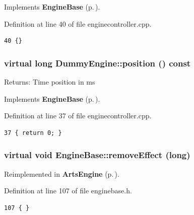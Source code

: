 Implements {\bf Engine\-Base} {\rm (p.\,\pageref{classEngineBase_EngineBasei0})}.

Definition at line 40 of file enginecontroller.cpp.



\footnotesize\begin{verbatim}40 {}
\end{verbatim}\normalsize 
{}
\subsubsection{\setlength{\rightskip}{0pt plus 5cm}virtual long Dummy\-Engine::position () const\hspace{0.3cm}{\tt  [inline, private, virtual]}}\label{classDummyEngine_DummyEngined4}


\begin{Desc}
\item[Returns:]Time position in ms \end{Desc}


Implements {\bf Engine\-Base} {\rm (p.\,\pageref{classEngineBase_EngineBasea7})}.

Definition at line 37 of file enginecontroller.cpp.



\footnotesize\begin{verbatim}37 { return 0; }
\end{verbatim}\normalsize 
{}
\subsubsection{\setlength{\rightskip}{0pt plus 5cm}virtual void Engine\-Base::remove\-Effect (long)\hspace{0.3cm}{\tt  [inline, virtual, inherited]}}\label{classEngineBase_EngineBasea21}




Reimplemented in {\bf Arts\-Engine} {\rm (p.\,\pageref{classArtsEngine_ArtsEnginea15})}.

Definition at line 107 of file enginebase.h.



\footnotesize\begin{verbatim}107 { }
\end{verbatim}\normalsize 
{}
